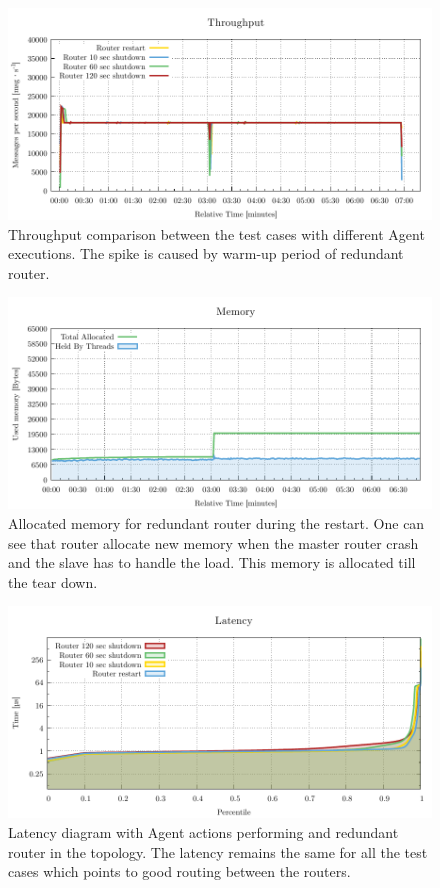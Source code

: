 \begin{figure}[H]
	\centering
	\includegraphics[width=1\linewidth]{obrazky-figures/charts/agent-redundant-throughput.pdf}
	\caption{Throughput comparison between the test cases with different Agent executions. The spike is caused by warm-up period of redundant router.}
	\label{fig:agent-redundant-throughput}
\end{figure}

\begin{figure}[H]
	\centering
	\includegraphics[width=1\linewidth]{obrazky-figures/charts/restart-redundant-agent-memory.pdf}
	\caption{Allocated memory for redundant router during the restart. One can see that router allocate new memory when the master router crash and the slave has to handle the load. This memory is allocated till the tear down.}
	\label{fig:agent-redundant-memory}
\end{figure}

\begin{figure}[H]
	\centering
	\includegraphics[width=1\linewidth]{obrazky-figures/charts/agent-redundant-latency.pdf}
	\caption{Latency diagram with Agent actions performing and redundant router in the topology. The latency remains the same for all the test cases which points to good routing between the routers.}
	\label{fig:agent-redundant-latency}
\end{figure}

